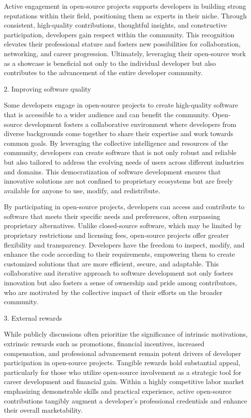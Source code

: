 Active engagement in open-source projects supports developers in building strong reputations within their field, positioning them as experts in their niche. Through consistent, high-quality contributions, thoughtful insights, and constructive participation, developers gain respect within the community. This recognition elevates their professional stature and fosters new possibilities for collaboration, networking, and career progression. Ultimately, leveraging their open-source work as a showcase is beneficial not only to the individual developer but also contributes to the advancement of the entire developer community.

2. Improving software quality

Some developers engage in open-source projects to create high-quality software that is accessible to a wider audience and can benefit the community. Open-source development fosters a collaborative environment where developers from diverse backgrounds come together to share their expertise and work towards common goals. By leveraging the collective intelligence and resources of the community, developers can create software that is not only robust and reliable but also tailored to address the evolving needs of users across different industries and domains. This democratization of software development ensures that innovative solutions are not confined to proprietary ecosystems but are freely available for anyone to use, modify, and redistribute.

By participating in open-source projects, developers can access and contribute to software that meets their specific needs and preferences, often surpassing proprietary alternatives. Unlike closed-source software, which may be limited by proprietary restrictions and licensing fees, open-source projects offer greater flexibility and transparency. Developers have the freedom to inspect, modify, and enhance the code according to their requirements, empowering them to create customized solutions that are more efficient, secure, and adaptable. This collaborative and iterative approach to software development not only fosters innovation but also fosters a sense of ownership and pride among contributors, who are motivated by the collective impact of their efforts on the broader community.

3. External rewards

While publicly discussions often prioritize the significance of intrinsic motivations, extrinsic rewards such as promotions, financial incentives, increased compensation, and professional advancement remain potent drivers of developer participation in open-source projects. Tangible rewards hold substantial appeal, particularly for those who utilize open-source involvement as a strategic tool for career development and financial gain. Within a highly competitive labor market emphasizing demonstrable skills and practical experience, active open-source contributions tangibly augment a developer's professional credentials and enhance their overall marketability.

